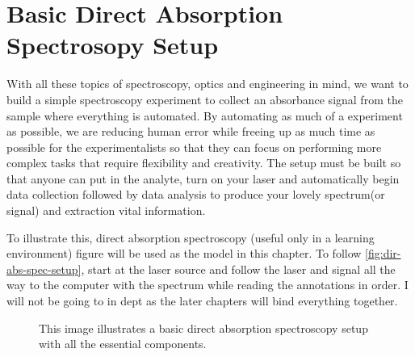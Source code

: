 \documentclass[11pt,a4paper]{book}
\newcommand{\imginput}[1]{} %
\begin{document}
	\section{Basic Direct Absorption Spectrosopy Setup}
		\label{sec:Basic Direct Absorption Spectrosopy Setup}
		With all these topics of spectroscopy, optics and engineering in mind, we want to build a simple spectroscopy experiment to collect an absorbance signal from the sample where everything is automated. By automating as much of a experiment as possible, we are reducing human error while freeing up as much time as possible for the experimentalists so that they  can focus on performing more complex tasks that require flexibility and creativity. The setup must be built so that anyone can put in the analyte, turn on your laser and automatically begin data collection followed by data analysis to produce your lovely spectrum(or signal) and extraction vital information.
		
		To illustrate this, direct absorption spectroscopy (useful only in a learning environment) figure will be used as the model in this chapter. To follow \autoref{fig:dir-abs-spec-setup}, start at the laser source and follow the laser and signal all the way to the computer with the spectrum while reading the annotations in order. I will not be going to in dept as the later chapters will bind everything together.	
		
		\begin{figure} [!ht]
			\centering
			\def\svgwidth{\columnwidth}
			\resizebox{16cm}{!}{\imginput{images/dir-abs-spec-setup.pdf_tex}}
			\caption{This image illustrates a basic direct absorption spectroscopy setup with all the essential components.}
			\label{fig:dir-abs-spec-setup}
		\end{figure}	
		
\end{document}
